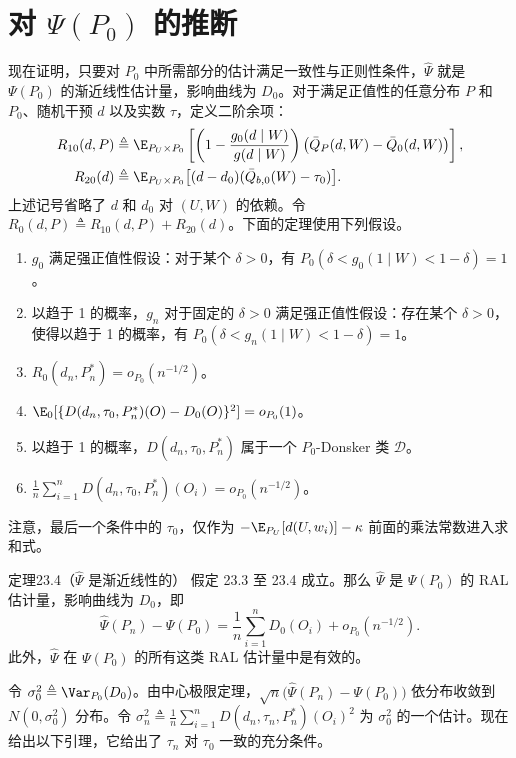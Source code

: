 \section{对 \texorpdfstring{$\Psi(P_0)$}{Ψ(P0)} 的推断}

现在证明，只要对 $P_0$ 中所需部分的估计满足一致性与正则性条件，$\hat\Psi$ 就是 $\Psi(P_0)$ 的渐近线性估计量，影响曲线为 $D_0$。对于满足正值性的任意分布 $P$ 和 $P_0$、随机干预 $d$ 以及实数 $\tau$，定义二阶余项：
\[
\begin{aligned}
 R_{10}(d,P)&\triangleq\E_{P_U\times P_0}\left[\left(1-\frac{g_0(d\mid W)}{g(d\mid W)}\right)
 \bigl(\bar Q_P(d,W)-\bar Q_0(d,W)\bigr)\right],\\
 R_{20}(d)&\triangleq\E_{P_U\times P_0}\bigl[(d-d_0)(\bar Q_{b,0}(W)-\tau_0)\bigr].
\end{aligned}
\]
上述记号省略了 $d$ 和 $d_0$ 对 $(U,W)$ 的依赖。令 $R_0(d,P)\triangleq R_{10}(d,P)+R_{20}(d)$。下面的定理使用下列假设。
\begin{enumerate}[label=(C\arabic*),start=5,leftmargin=3.6em]
\item $g_0$ 满足强正值性假设：对于某个 $\delta>0$，有 $P_0(\delta<g_0(1\mid W)<1-\delta)=1$。
\item 以趋于 1 的概率，$g_n$ 对于固定的 $\delta>0$ 满足强正值性假设：存在某个 $\delta>0$，使得以趋于 1 的概率，有 $P_0(\delta<g_n(1\mid W)<1-\delta)=1$。
\item $R_0(d_n,P_n^*)=o_{P_0}(n^{-1/2})$。
\item $\E_0[\{D(d_n,\tau_0,P_n^*)(O)-D_0(O)\}^2]=o_{P_0}(1)$。
\item 以趋于 1 的概率，$D(d_n,\tau_0,P_n^*)$ 属于一个 $P_0$-Donsker 类 $\mathcal D$。
\item $\frac1n\sum_{i=1}^nD(d_n,\tau_0,P_n^*)(O_i)=o_{P_0}(n^{-1/2})$。
\end{enumerate}
注意，最后一个条件中的 $\tau_0$，仅作为 $-\E_{P_U}[d(U,w_i)]-\kappa$ 前面的乘法常数进入求和式。

\begin{bookresult}{定理}{23.4（$\hat\Psi$ 是渐近线性的）}
假定 23.3 至 23.4 成立。那么 $\hat\Psi$ 是 $\Psi(P_0)$ 的 RAL 估计量，影响曲线为 $D_0$，即
\[
 \hat\Psi(P_n)-\Psi(P_0)=\frac1n\sum_{i=1}^nD_0(O_i)+o_{P_0}(n^{-1/2}).
\]
此外，$\hat\Psi$ 在 $\Psi(P_0)$ 的所有这类 RAL 估计量中是有效的。
\end{bookresult}

令 $\sigma_0^2\triangleq\Var_{P_0}(D_0)$。由中心极限定理，$\sqrt n\bigl(\hat\Psi(P_n)-\Psi(P_0)\bigr)$ 依分布收敛到 $N(0,\sigma_0^2)$ 分布。令
$\sigma_n^2\triangleq\frac1n\sum_{i=1}^nD(d_n,\tau_n,P_n^*)(O_i)^2$
为 $\sigma_0^2$ 的一个估计。现在给出以下引理，它给出了 $\tau_n$ 对 $\tau_0$ 一致的充分条件。

